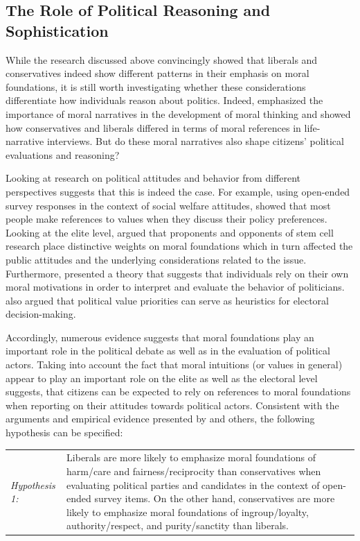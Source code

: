 \documentclass[12pt]{article}
\begin{document}
\subsection{The Role of Political Reasoning and Sophistication}

While the research discussed above convincingly showed that liberals and conservatives indeed show different patterns in their emphasis on moral foundations, it is still worth investigating whether these considerations differentiate how individuals reason about politics. Indeed, \citet{haidt2008moral} emphasized the importance of moral narratives in the development of moral thinking and \citet{mcadams2008family} showed how conservatives and liberals differed in terms of moral references in life-narrative interviews. But do these moral narratives also shape citizens' political evaluations and reasoning?

Looking at research on political attitudes and behavior from different perspectives suggests that this is indeed the case. For example, using open-ended survey responses in the context of social welfare attitudes, \citet{feldman1992political} showed that most people make references to values when they discuss their policy preferences. Looking at the elite level, \citet{clifford2013words} argued that proponents and opponents of stem cell research place distinctive weights on moral foundations which in turn affected the public attitudes and the underlying considerations related to the issue. Furthermore, \citet{clifford2014linking} presented a theory that suggests that individuals rely on their own moral motivations in order to interpret and evaluate the behavior of politicians. \citet{marietta2007values} also argued that political value priorities can serve as heuristics for electoral decision-making.

Accordingly, numerous evidence suggests that moral foundations play an important role in the political debate as well as in the evaluation of political actors. Taking into account the fact that moral intuitions (or values in general) appear to play an important role on the elite as well as the electoral level suggests, that citizens can be expected to rely on references to moral foundations when reporting on their attitudes towards political actors. Consistent with the arguments and empirical evidence presented by \citet{graham2009liberals} and others, the following hypothesis can be specified:

\vspace{0.3cm}
\begin{tabular}{lp{12cm}}
\textsl{Hypothesis 1:} & Liberals are more likely to emphasize moral foundations of harm/care and fairness/reciprocity  than conservatives when evaluating political parties and candidates in the context of open-ended survey items. On the other hand, conservatives are more likely to emphasize moral foundations of ingroup/loyalty, authority/respect, and purity/sanctity than liberals.
\end{tabular}
\vspace{0.5cm}
\end{document}
